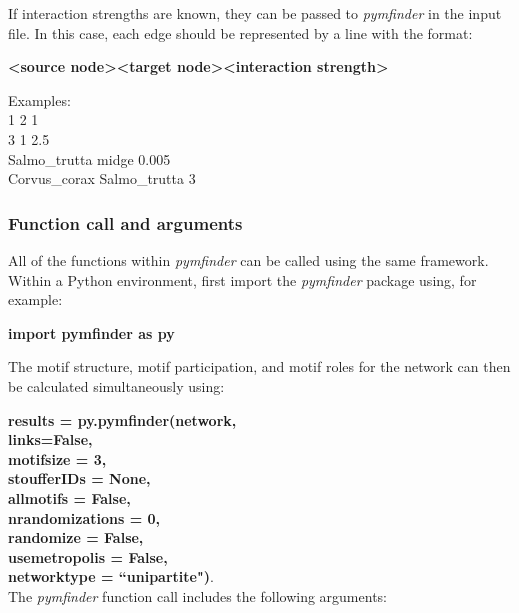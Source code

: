 \documentclass[12pt]{article}
\begin{document}
			If interaction strengths are known, they can be passed to \emph{pymfinder} in the input file. In this case, each edge should be represented by a line with the format:

			\textbf{\textless source node\textgreater \textless target node\textgreater \textless interaction strength\textgreater}

			Examples:\\
			1 2 1\\
			3 1 2.5\\
			Salmo\_trutta midge 0.005\\
			Corvus\_corax Salmo\_trutta 3\\

		\subsubsection{Function call and arguments}

			All of the functions within \emph{pymfinder} can be called using the same framework. Within a Python environment, first import the \emph{pymfinder} package using, for example:

			\textbf{import pymfinder as py}

			The motif structure, motif participation, and motif roles for the network can then be calculated simultaneously using:

			\textbf{results = py.pymfinder(network,\\
								links=False,\\
	              motifsize = 3,\\
	              stoufferIDs = None,\\
	              allmotifs = False,\\
	              nrandomizations = 0,\\
	              randomize = False,\\
	              usemetropolis = False,\\
	              networktype = ``unipartite")}.\\


			The \emph{pymfinder} function call includes the following arguments:
\end{document}
